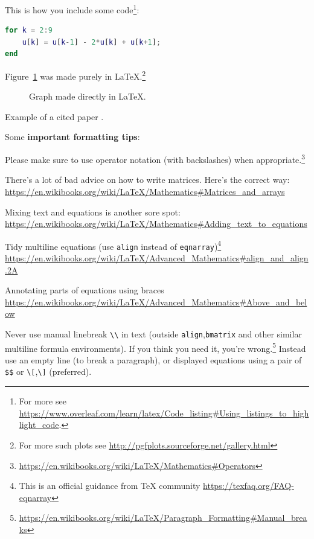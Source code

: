 \documentclass{amsart}
\begin{document}
 This is how you include some code\footnote{For more see \url{https://www.overleaf.com/learn/latex/Code_listing\#Using_listings_to_highlight_code}.}:
\begin{lstlisting}[language=Matlab]
for k = 2:9
    u[k] = u[k-1] - 2*u[k] + u[k+1];
end
\end{lstlisting}

Figure~\ref{fig:csvfig} was made purely in \LaTeX.\footnote{For more such plots see \url{http://pgfplots.sourceforge.net/gallery.html}}

\begin{figure}[htb]
  \centering
\caption{Graph made directly in LaTeX.}\label{fig:csvfig}
\end{figure}

Example of a cited paper \cite{Hill1894}.

 Some \textbf{important formatting tips}:
\begin{compactitem}
\item Please make sure to use operator notation (with backslashes) when appropriate.\footnote{\url{https://en.wikibooks.org/wiki/LaTeX/Mathematics\#Operators}}
\item There's a lot of bad advice on how to write matrices. Here's the correct way: \url{https://en.wikibooks.org/wiki/LaTeX/Mathematics\#Matrices_and_arrays}
\item Mixing text and equations is another sore spot: \url{https://en.wikibooks.org/wiki/LaTeX/Mathematics\#Adding_text_to_equations}
\item Tidy multiline equations (use \verb|align| instead of \verb|eqnarray|)\footnote{This is an official guidance from TeX community \url{https://texfaq.org/FAQ-eqnarray}} \url{https://en.wikibooks.org/wiki/LaTeX/Advanced_Mathematics\#align_and_align.2A}
\item Annotating parts of equations using braces \url{https://en.wikibooks.org/wiki/LaTeX/Advanced_Mathematics\#Above_and_below}
\item Never use manual linebreak \verb|\\| in text (outside \verb|align|,\verb|bmatrix| and other similar multiline formula environments). If you think you need it, you're wrong.\footnote{\url{https://en.wikibooks.org/wiki/LaTeX/Paragraph_Formatting\#Manual_breaks}} Instead use an empty line (to break a paragraph), or displayed equations using a pair of \verb|$$| or \verb|\[|,\verb|\]| (preferred).
\end{compactitem}
\end{document}
